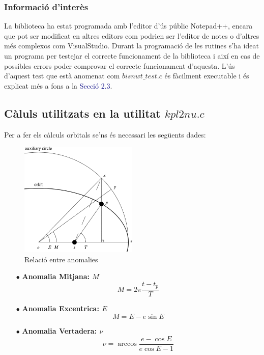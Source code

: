 \documentclass[12pt]{article}
\begin{document}
\subsubsection{Informació d'interès}
La biblioteca ha estat programada amb l'editor d'ús públic Notepad++, encara que pot ser modificat en altres editors com podrien ser l'editor de notes o d'altres més complexos com VisualStudio.
\newline
Durant la programació de les rutines s'ha ideat un programa per testejar el correcte funcionament de la biblioteca i així en cas de possibles errors poder comprovar el correcte funcionament d'aquesta.
\newline
L'ús d'aquest test que està anomenat com $bisnwt\_test.c$
és fàcilment executable i és explicat més a fons a la \textcolor{navy}{Secció 2.3}.
\newpage
\subsection{Càluls utilitzats en la utilitat $kpl2nu.c$}
Per a fer els càlculs orbitals se'ns és necessari les següents dades:
\begin{figure}
\begin{center}
\includegraphics[width=0.5\textwidth]{Kepler's-equation-scheme.png}
\end{center}
\caption{Relació entre anomalies}
\label{fig:relacio-anomalies}
\end{figure}
\begin{itemize}
\item [$\bullet$] \textbf{Anomalia Mitjana: $M$}
\newline
$$M=2\pi\frac{t-t_p}{T}$$
\item [$\bullet$] \textbf{Anomalia Excentrica: $E$}
\newline
$$M=E-e\sin{E}$$
\item [$\bullet$] \textbf{Anomalia Vertadera: $\nu$}
\newline
$$\nu=\arccos{\frac{e-\cos{E}}{e\cos{E}-1}}$$
\end{itemize}
\end{document}
